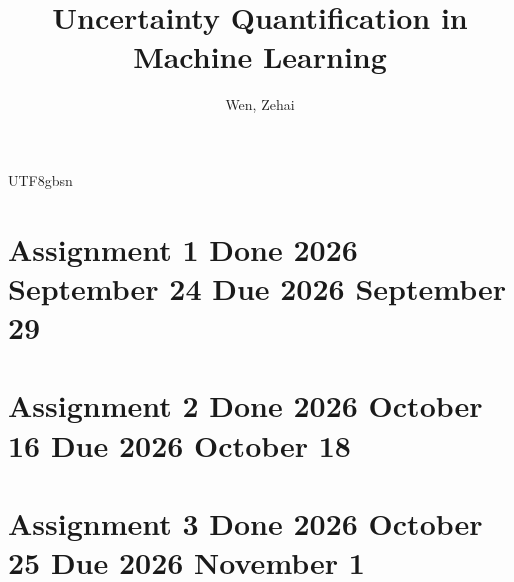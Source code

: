 \documentclass[12pt]{report}
\title{Uncertainty Quantification in Machine Learning}
\author{Wen, Zehai}
\date{\DTMnow}
\theoremstyle{plain}
\theoremstyle{definition}
\begin{document}
\begin{CJK*}{UTF8}{gbsn}
\maketitle

\setcounter{tocdepth}{0}
\tableofcontents

\chapter{Assignment 1 Done 2026 September 24 Due 2026 September 29}


\chapter{Assignment 2 Done 2026 October 16 Due 2026 October 18}


\chapter{Assignment 3 Done 2026 October 25 Due 2026 November 1}



\end{CJK*}
\end{document}
